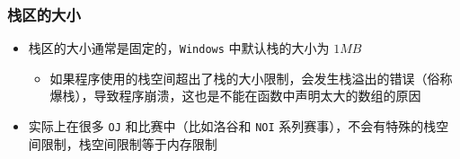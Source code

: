 \begin{frame}[fragile]
\begin{columns}
    \end{columns}

    \begin{itemize}
    \end{itemize}

\end{frame}

\begin{frame}[fragile]
    \frametitle{栈区的大小}

    \begin{itemize}
        \item<1-> 栈区的大小通常是固定的，\lstinline|Windows| 中默认栈的大小为 $1 MB$
            \begin{itemize}
                \item 如果程序使用的栈空间超出了栈的大小限制，会发生栈溢出的错误（俗称爆栈），导致程序崩溃，这也是不能在函数中声明太大的数组的原因
            \end{itemize}
       \item<2-> 实际上在很多 \lstinline|OJ| 和比赛中（比如洛谷和 \lstinline|NOI| 系列赛事），不会有特殊的栈空间限制，栈空间限制等于内存限制
    \end{itemize}
\end{frame}


